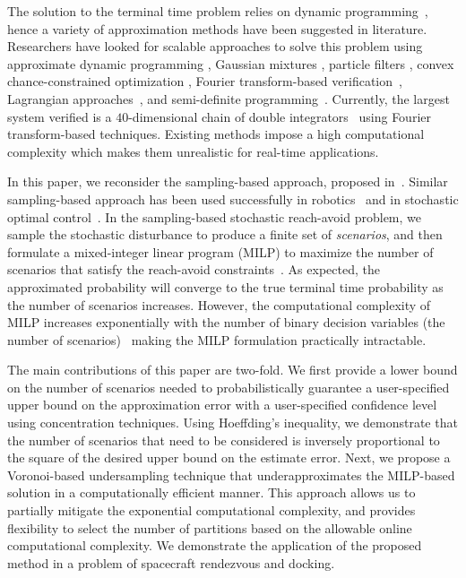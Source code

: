 \documentclass[11pt,letterpaper]{article}
\begin{document}
    The solution to the terminal time problem relies on dynamic programming~\cite{SummersAutomatica2010,AbateAutomatica2008,AbateHSCC2007}, hence a variety of approximation methods have been suggested in literature. Researchers have looked for scalable approaches to solve this problem using approximate dynamic programming \cite{KariotoglouSCL2016, ManganiniCYB2015}, Gaussian mixtures \cite{KariotoglouSCL2016}, particle filters \cite{ManganiniCYB2015, lesser2013stochastic}, convex chance-constrained optimization \cite{lesser2013stochastic}, Fourier transform-based verification~\cite{VinodLCSS2017, VinodHSCC2018}, Lagrangian approaches~\cite{GleasonCDC2017}, and semi-definite programming~\cite{SDP_kariotgolou}.  Currently, the largest system verified is a $40$-dimensional chain of double integrators~\cite{VinodLCSS2017, VinodHSCC2018} using Fourier transform-based techniques.  Existing methods impose a high computational complexity which makes them unrealistic for real-time applications.  

    In this paper, we reconsider the sampling-based approach, proposed in~\cite{lesser2013stochastic}. 
    Similar sampling-based approach has been used successfully in robotics~\cite{blackmore2010probabilistic} and in stochastic optimal control~\cite{satipizadeh2018Automatica,sartipizadeh2018CCTOOL,calafiore2013stochastic,calafiore2006scenario}. In the sampling-based stochastic reach-avoid problem, we sample the stochastic disturbance to produce a finite set of \emph{scenarios}, and then formulate a mixed-integer linear program (MILP) to maximize the number of scenarios that satisfy the reach-avoid constraints~\cite{blackmore2010probabilistic,lesser2013stochastic}. 
As expected, the approximated probability will converge to the true terminal time probability as the number of scenarios increases. However, the computational complexity of MILP increases exponentially with the number of binary decision variables (the number of scenarios)~\cite[Rem. 1]{bemporad_control_1999} making the MILP formulation practically intractable.  
 
 The main contributions of this paper are two-fold. We first provide a lower
    bound on the number of scenarios needed to probabilistically guarantee a user-specified
    upper bound on the approximation error with a user-specified confidence level using concentration techniques.
    Using Hoeffding's inequality, we demonstrate that the number
    of scenarios that need to be considered is inversely proportional
    to the square of the desired upper bound on the estimate error.
    Next, we propose a Voronoi-based undersampling technique that
    underapproximates the MILP-based solution in a computationally efficient manner. This approach allows us to partially mitigate the exponential computational complexity, and provides flexibility to select the number of partitions based on the allowable online computational complexity. We demonstrate the application of the proposed method in a problem of spacecraft rendezvous and docking.
\end{document}
